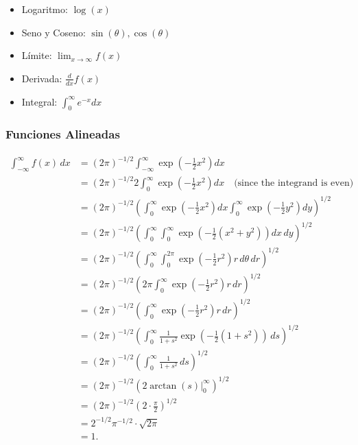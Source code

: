 \documentclass[
  10pt,
]{article}
\providecommand{\tightlist}{%
  \setlength{\itemsep}{0pt}\setlength{\parskip}{0pt}}\usepackage{longtable,booktabs,array}
\begin{document}
\begin{itemize}
\tightlist
\item
  Logaritmo: \(\log(x)\)
\item
  Seno y Coseno: \(\sin(\theta), \cos(\theta)\)
\item
  Límite: \(\lim_{x \to \infty} f(x)\)
\item
  Derivada: \(\frac{d}{dx} f(x)\)
\item
  Integral: \(\int_0^\infty e^{-x} dx\)
\end{itemize}

\subsubsection{Funciones Alineadas}\label{funciones-alineadas}

\[
\begin{aligned}
\int_{-\infty}^\infty f(x) \, dx 
&= (2\pi)^{-1/2} \int_{-\infty}^\infty \exp\left(-\frac{1}{2}x^2\right) dx \\
&= (2\pi)^{-1/2} 2 \int_{0}^\infty \exp\left(-\frac{1}{2}x^2\right) dx 
\quad \text{(since the integrand is even)} \\
&= (2\pi)^{-1/2} \left( \int_{0}^\infty \exp\left(-\frac{1}{2}x^2\right) dx 
\int_{0}^\infty \exp\left(-\frac{1}{2}y^2\right) dy \right)^{1/2} \\
&= (2\pi)^{-1/2} \left( \int_{0}^\infty \int_{0}^\infty \exp\left(-\frac{1}{2}(x^2 + y^2)\right) dx \, dy \right)^{1/2} \\
&= (2\pi)^{-1/2} \left( \int_{0}^\infty \int_{0}^{2\pi} \exp\left(-\frac{1}{2}r^2\right) r \, d\theta \, dr \right)^{1/2} \\
&= (2\pi)^{-1/2} \left( 2\pi \int_{0}^\infty \exp\left(-\frac{1}{2}r^2\right) r \, dr \right)^{1/2} \\
&= (2\pi)^{-1/2} \left( \int_{0}^\infty \exp\left(-\frac{1}{2}r^2\right) r \, dr \right)^{1/2} \\
&= (2\pi)^{-1/2} \left( \int_{0}^\infty \frac{1}{1+s^2} \exp\left(-\frac{1}{2}(1+s^2)\right) \, ds \right)^{1/2} \\
&= (2\pi)^{-1/2} \left( \int_{0}^\infty \frac{1}{1+s^2} \, ds \right)^{1/2} \\
&= (2\pi)^{-1/2} \left( 2 \arctan(s) \Big|_0^\infty \right)^{1/2} \\
&= (2\pi)^{-1/2} \left( 2 \cdot \frac{\pi}{2} \right)^{1/2} \\
&= 2^{-1/2} \pi^{-1/2} \cdot \sqrt{2\pi} \\
&= 1.
\end{aligned}
\] \newpage
\end{document}
